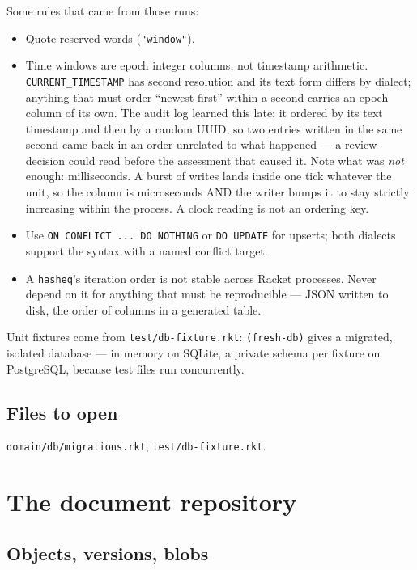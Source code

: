 \documentclass[11pt,a4paper]{report}
\gdef\currentchapterart{art/telemachus-head.png}
\newcommand{\chapterart}[1]{\gdef\currentchapterart{#1}}
\newcommand{\chapterart}[1]{}
\begin{document}
Some rules that came from those runs:

\begin{itemize}
\item Quote reserved words (\texttt{"window"}).
\item Time windows are epoch integer columns, not timestamp arithmetic. \texttt{CURRENT\_TIMESTAMP} has second resolution and its text form differs by dialect; anything that must order ``newest first'' within a second carries an epoch column of its own. The audit log learned this late: it ordered by its text timestamp and then by a random UUID, so two entries written in the same second came back in an order unrelated to what happened --- a review decision could read before the assessment that caused it. Note what was \emph{not} enough: milliseconds. A burst of writes lands inside one tick whatever the unit, so the column is microseconds AND the writer bumps it to stay strictly increasing within the process. A clock reading is not an ordering key.
\item Use \texttt{ON CONFLICT ... DO NOTHING} or \texttt{DO UPDATE} for upserts; both dialects support the syntax with a named conflict target.
\item A \texttt{hasheq}'s iteration order is not stable across Racket processes. Never depend on it for anything that must be reproducible --- JSON written to disk, the order of columns in a generated table.
\end{itemize}

Unit fixtures come from \texttt{test/db-fixture.rkt}: \texttt{(fresh-db)} gives a migrated, isolated database --- in memory on SQLite, a private schema per fixture on PostgreSQL, because test files run concurrently.

\section{Files to open}

\texttt{domain/db/migrations.rkt}, \texttt{test/db-fixture.rkt}.

\chapterart{art/ch-06-repo.png}
\chapter{The document repository}

\section{Objects, versions, blobs}
\end{document}

